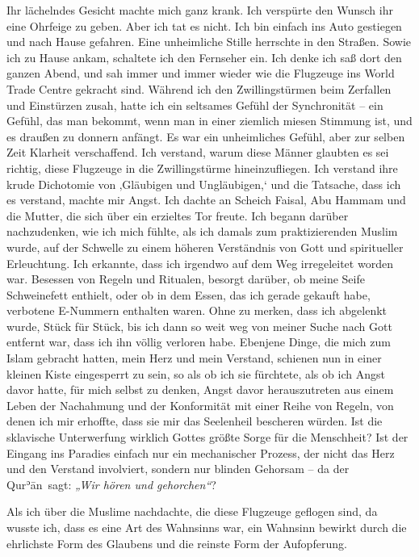 \documentclass[12pt]{memoir}
\def\´{ʾ} %
\def \Quran{Qur\-\´ān} %
\def\–{\hskip0pt-\hskip0pt}
\begin{document}
Ihr lächelndes Gesicht machte mich ganz krank.
Ich verspürte den Wunsch ihr eine Ohrfeige zu geben.
Aber ich tat es nicht.
Ich bin einfach ins Auto gestiegen und nach Hause gefahren.
Eine unheimliche Stille herrschte in den Straßen.
Sowie ich zu Hause ankam, schaltete ich den Fernseher ein.
Ich denke ich saß dort den ganzen Abend,
und sah immer und immer wieder wie die Flugzeuge
ins World Trade Centre gekracht sind.
Während ich den Zwillingstürmen beim Zerfallen und Einstürzen zusah,
hatte ich ein seltsames Gefühl der Synchronität –
ein Gefühl, das man bekommt,
wenn man in einer ziemlich miesen Stimmung ist,
und es draußen zu donnern anfängt.
Es war ein unheimliches Gefühl, aber zur selben Zeit Klarheit verschaffend.
Ich verstand, warum diese Männer glaubten es sei richtig,
diese Flugzeuge in die Zwillingstürme hineinzufliegen.
Ich verstand ihre krude Dichotomie von ‚Gläubigen und Ungläubigen,‘
und die Tatsache, dass ich es verstand, machte mir Angst.
Ich dachte an Scheich Faisal, Abu Hammam und die Mutter,
die sich über ein erzieltes Tor freute.
Ich begann darüber nachzudenken,
wie ich mich fühlte, als ich damals zum praktizierenden Muslim wurde,
auf der Schwelle zu einem höheren Verständnis
von Gott und spiritueller Erleuchtung.
Ich erkannte, dass ich irgendwo auf dem Weg irregeleitet worden war.
Besessen von Regeln und Ritualen, besorgt darüber,
ob meine Seife Schweinefett enthielt,
oder ob in dem Essen, das ich gerade gekauft habe,
verbotene E\–Nummern enthalten waren.
Ohne zu merken, dass ich abgelenkt wurde, Stück für Stück,
bis ich dann so weit weg von meiner Suche nach Gott entfernt war,
dass ich ihn völlig verloren habe.
Ebenjene Dinge, die mich zum Islam gebracht hatten,
mein Herz und mein Verstand,
schienen nun in einer kleinen Kiste eingesperrt zu sein,
so als ob ich sie fürchtete,
als ob ich Angst davor hatte, für mich selbst zu denken,
Angst davor herauszutreten aus einem Leben der Nachahmung
und der Konformität mit einer Reihe von Regeln,
von denen ich mir erhoffte, dass sie mir das Seelenheil bescheren würden.
Ist die sklavische Unterwerfung wirklich Gottes
größte Sorge für die Menschheit?
Ist der Eingang ins Paradies einfach nur ein mechanischer Prozess,
der nicht das Herz und den Verstand involviert,
sondern nur blinden Gehorsam – da der \Quran\ sagt:
\emph{„Wir hören und gehorchen“}?

Als ich über die Muslime nachdachte, die diese Flugzeuge geflogen sind,
da wusste ich, dass es eine Art des Wahnsinns war,
ein Wahnsinn bewirkt durch die ehrlichste Form des Glaubens
und die reinste Form der Aufopferung.
\end{document}
